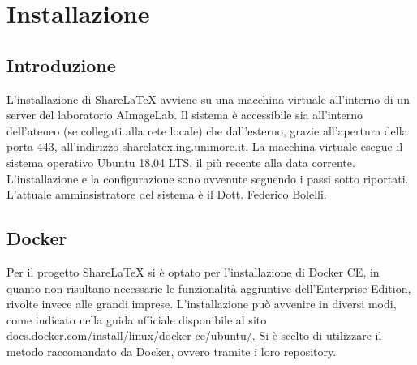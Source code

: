 \chapter{Installazione}
\label{Installazione}
\thispagestyle{empty}
\lstset{style=my-bash}

\section{Introduzione}
L'installazione di ShareLaTeX avviene su una macchina virtuale all'interno di un server del laboratorio AImageLab. Il sistema è accessibile sia all'interno dell'ateneo (se collegati alla rete locale) che dall'esterno, grazie all'apertura della porta 443, all'indirizzo \url{sharelatex.ing.unimore.it}. La macchina virtuale esegue il sistema operativo Ubuntu 18.04 LTS, il più recente alla data corrente. L'installazione e la configurazione sono avvenute seguendo i passi sotto riportati. L'attuale amminsistratore del sistema è il Dott. Federico Bolelli.

\section{Docker}
Per il progetto ShareLaTeX si è optato per l'installazione di Docker CE, in quanto non risultano necessarie le funzionalità aggiuntive dell'Enterprise Edition, rivolte invece alle grandi imprese. L'installazione può avvenire in diversi modi, come indicato nella guida ufficiale disponibile al sito \url{docs.docker.com/install/linux/docker-ce/ubuntu/}. Si è scelto di utilizzare il metodo raccomandato da Docker, ovvero tramite i loro repository.

